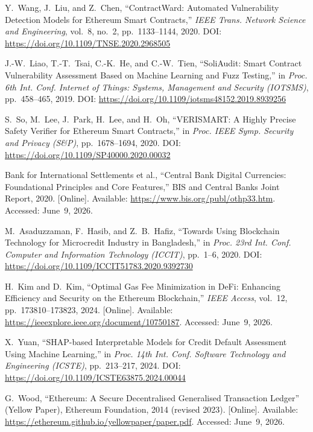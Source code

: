 \documentclass[12pt, a4paper]{report}
\begin{document}
{\begin{enumerate}[label={[\arabic*]}]
\item Y.~Wang, J.~Liu, and Z.~Chen, ``ContractWard: Automated Vulnerability Detection Models for Ethereum Smart Contracts,'' \textit{IEEE Trans. Network Science and Engineering}, vol.~8, no.~2, pp.~1133--1144, 2020. DOI: \url{https://doi.org/10.1109/TNSE.2020.2968505}

\item J.-W.~Liao, T.-T.~Tsai, C.-K.~He, and C.-W.~Tien, ``SoliAudit: Smart Contract Vulnerability Assessment Based on Machine Learning and Fuzz Testing,'' in \textit{Proc. 6th Int. Conf. Internet of Things: Systems, Management and Security (IOTSMS)}, pp.~458--465, 2019. DOI: \url{https://doi.org/10.1109/iotsms48152.2019.8939256}

\item S.~So, M.~Lee, J.~Park, H.~Lee, and H.~Oh, ``VERISMART: A Highly Precise Safety Verifier for Ethereum Smart Contracts,'' in \textit{Proc. IEEE Symp. Security and Privacy (S\&P)}, pp.~1678--1694, 2020. DOI: \url{https://doi.org/10.1109/SP40000.2020.00032}

\item Bank for International Settlements et al., ``Central Bank Digital Currencies: Foundational Principles and Core Features,'' BIS and Central Banks Joint Report, 2020. [Online]. Available: \url{https://www.bis.org/publ/othp33.htm}. Accessed: June~9, 2026.

\item M.~Asaduzzaman, F.~Hasib, and Z.~B.~Hafiz, ``Towards Using Blockchain Technology for Microcredit Industry in Bangladesh,'' in \textit{Proc. 23rd Int. Conf. Computer and Information Technology (ICCIT)}, pp.~1--6, 2020. DOI: \url{https://doi.org/10.1109/ICCIT51783.2020.9392730}

\item H.~Kim and D.~Kim, ``Optimal Gas Fee Minimization in DeFi: Enhancing Efficiency and Security on the Ethereum Blockchain,'' \textit{IEEE Access}, vol.~12, pp.~173810--173823, 2024. [Online]. Available: \url{https://ieeexplore.ieee.org/document/10750187}. Accessed: June~9, 2026.

\item X.~Yuan, ``SHAP-based Interpretable Models for Credit Default Assessment Using Machine Learning,'' in \textit{Proc. 14th Int. Conf. Software Technology and Engineering (ICSTE)}, pp.~213--217, 2024. DOI: \url{https://doi.org/10.1109/ICSTE63875.2024.00044}

\item G.~Wood, ``Ethereum: A Secure Decentralised Generalised Transaction Ledger'' (Yellow Paper), Ethereum Foundation, 2014 (revised 2023). [Online]. Available: \url{https://ethereum.github.io/yellowpaper/paper.pdf}. Accessed: June~9, 2026.


\end{enumerate}}
\end{document}
